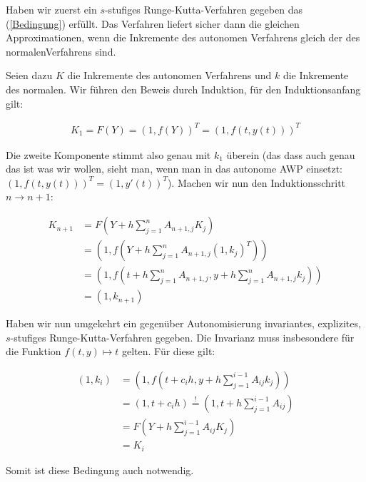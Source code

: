 \begin{solution}

Haben wir zuerst ein $s$-stufiges Runge-Kutta-Verfahren gegeben das (\ref{Bedingung})
erfüllt. Das Verfahren liefert sicher dann die gleichen Approximationen, wenn die Inkremente
des autonomen Verfahrens gleich der des \glqq normalen\grqq Verfahrens sind.

Seien dazu $K$ die Inkremente des autonomen Verfahrens und $k$ die Inkremente
des \glqq normalen\grqq. Wir führen den Beweis durch Induktion, für den Induktionsanfang gilt:

\begin{align*}
  K_1= F(Y) = (1,f(Y))^T = (1,f(t,y(t)))^T
\end{align*}

Die zweite Komponente stimmt also genau mit $k_1$ überein (das dass auch genau das ist
was wir wollen, sieht man, wenn man in das autonome AWP einsetzt:
$(1,f(t,y(t)))^T = (1,y'(t))^T$).
Machen wir nun den Induktionsschritt $n \rightarrow n+1$:

\begin{align*}
  K_{n+1} &= F(Y+h\sum_{j=1}^n A_{n+1,j}K_j) \\
  &= (1,f(Y+h\sum_{j=1}^n A_{n+1,j}(1,k_j)^T)) \\
  &= (1,f(t+h\sum_{j=1}^n A_{n+1,j},y+h\sum_{j=1}^n A_{n+1,j}k_j)) \\
  &= (1,k_{n+1})
\end{align*}

Haben wir nun umgekehrt ein gegenüber Autonomisierung invariantes, explizites,
$s$-stufiges Runge-Kutta-Verfahren gegeben. Die Invarianz muss insbesondere für
die Funktion $f(t,y) \mapsto t$ gelten.
Für diese gilt:

\begin{align*}
  (1,k_i) &= (1,f(t+c_ih,y+h\sum_{j=1}^{i-1}A_{ij}k_j)) \\
  &= (1,t+c_ih) \stackrel{!}{=} (1,t+h\sum_{j=1}^{i-1}A_{ij}) \\
  &= F(Y+h\sum_{j=1}^{i-1} A_{ij}K_j)\\
  &= K_i
\end{align*}

Somit ist diese Bedingung auch notwendig.
\end{solution}
